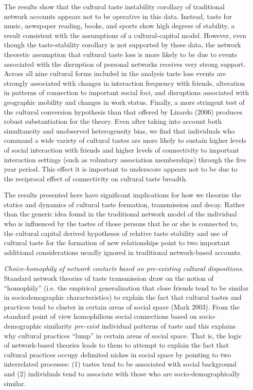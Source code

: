 \documentclass[
]{article}
\begin{document}
The results show that the cultural taste instability corollary of traditional network accounts appears not to be operative in this data. Instead, taste for music, newspaper reading, books, and sports show high degrees of stability, a result consistent with the assumptions of a cultural-capital model. However, even though the taste-stability corollary is not supported by these data, the network theoretic assumption that cultural taste loss is more likely to be due to events associated with the disruption of personal networks receives very strong support. Across all nine cultural forms included in the analysis taste loss events are strongly associated with changes in interaction frequency with friends, alteration in patterns of connection to important social foci, and disruptions associated with geographic mobility and changes in work status. Finally, a more stringent test of the cultural conversion hypothesis than that offered by Lizardo (2006) produces robust substantiation for the theory. Even after taking into account both simultaneity and unobserved heterogeneity bias, we find that individuals who command a wide variety of cultural tastes are more likely to sustain higher levels of social interaction with friends and higher levels of connectivity to important interaction settings (such as voluntary association memberships) through the five year period. This effect it is important to underscore appears not to be due to the reciprocal effect of connectivity on cultural taste breadth.

The results presented here have significant implications for how we theorize the statics and dynamics of cultural taste formation, transmission and decay. Rather than the generic idea found in the traditional network model of the individual who is influenced by the tastes of those persons that he or she is connected to, the cultural capital derived hypotheses of relative taste stability and use of cultural taste for the formation of new relationships point to two important additional considerations usually ignored in traditional network-based accounts.

\emph{Choice-homophily of network contacts based on pre-existing cultural dispositions}. Standard network theories of taste transmission draw on the notion of ``homophily'' (i.e. the empirical generalization that close friends tend to be similar in sociodemographic characteristics) to explain the fact that cultural tastes and practices tend to cluster in certain areas of social space (Mark 2003). From the standard point of view homophilious social connections based on socio-demographic similarity \emph{pre-exist} individual patterns of taste and this explains why cultural practices ``lump'' in certain areas of social space. That is, the logic of network-based theories leads to them to attempt to explain the fact that cultural practices occupy delimited niches in social space by pointing to two interrelated processes: (1) tastes tend to be associated with social background and (2) individuals tend to associate with those who are socio-demographically similar.
\end{document}
